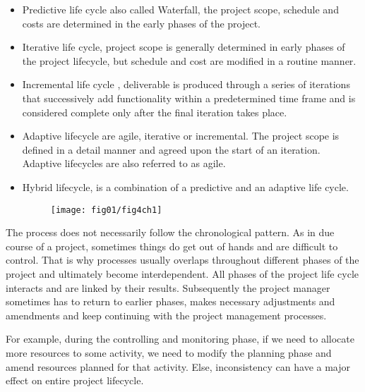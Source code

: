 \begin{itemize}
    \item Predictive life cycle also called Waterfall, the project scope, schedule and costs are determined in the early phases of the project.

    \item Iterative life cycle, project scope is generally determined in early phases of the project lifecycle, but schedule and cost are modified in a routine manner.

    \item Incremental life cycle \cite{PMBOK2013}, deliverable is produced through a series of iterations that successively add functionality within a predetermined time frame and is considered complete only after the final iteration takes place.

    \item Adaptive lifecycle are agile, iterative or incremental. The project scope is defined in a detail manner and agreed upon the start of an iteration. Adaptive lifecycles are also referred to as agile.
    \item Hybrid lifecycle, is a combination of a predictive and an adaptive life cycle. 
    
    \begin{figure}
    	\centering
    	\texttt{[image: fig01/fig4ch1]}
    \end{figure}
  
\end{itemize}

The process does not necessarily follow the chronological pattern. As in due course of a project, sometimes things do get out of hands and are difficult to control. That is why processes usually overlaps throughout different phases of the project and ultimately become interdependent. All phases of the project life cycle interacts and are linked by their results. Subsequently the project manager sometimes has to return to earlier phases, makes necessary adjustments and amendments and keep continuing with the project management processes. 

 
For example, during the controlling and monitoring phase, if we need to allocate more resources to some activity, we need to modify the planning phase and amend resources planned for that activity. Else, inconsistency can have a major effect on entire project lifecycle.

